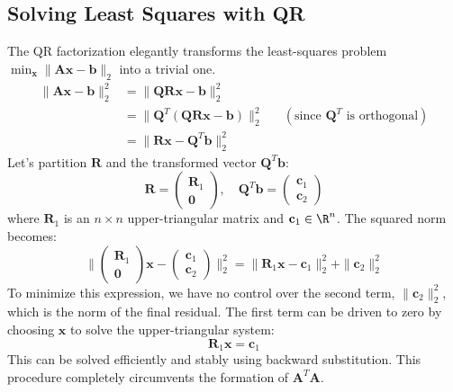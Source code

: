 \begin{proposition}
\subsection{Solving Least Squares with QR}
The QR factorization elegantly transforms the least-squares problem $\min_{\mathbf{x}} \|\mathbf{A}\mathbf{x} - \mathbf{b}\|_2$ into a trivial one.
\begin{align*}
    \|\mathbf{A}\mathbf{x} - \mathbf{b}\|_2^2 &= \|\mathbf{Q}\mathbf{R}\mathbf{x} - \mathbf{b}\|_2^2 \\
    &= \|\mathbf{Q}^T(\mathbf{Q}\mathbf{R}\mathbf{x} - \mathbf{b})\|_2^2 && (\text{since } \mathbf{Q}^T \text{ is orthogonal}) \\
    &= \|\mathbf{R}\mathbf{x} - \mathbf{Q}^T\mathbf{b}\|_2^2
\end{align*}
Let's partition $\mathbf{R}$ and the transformed vector $\mathbf{Q}^T\mathbf{b}$:
\[ \mathbf{R} = \begin{pmatrix} \mathbf{R}_1 \\ \mathbf{0} \end{pmatrix}, \quad \mathbf{Q}^T\mathbf{b} = \begin{pmatrix} \mathbf{c}_1 \\ \mathbf{c}_2 \end{pmatrix} \]
where $\mathbf{R}_1$ is an $n \times n$ upper-triangular matrix and $\mathbf{c}_1 \in \R^n$. The squared norm becomes:
\[ \|\begin{pmatrix} \mathbf{R}_1 \\ \mathbf{0} \end{pmatrix} \mathbf{x} - \begin{pmatrix} \mathbf{c}_1 \\ \mathbf{c}_2 \end{pmatrix}\|_2^2 = \|\mathbf{R}_1\mathbf{x} - \mathbf{c}_1\|_2^2 + \|\mathbf{c}_2\|_2^2 \]
To minimize this expression, we have no control over the second term, $\|\mathbf{c}_2\|_2^2$, which is the norm of the final residual. The first term can be driven to zero by choosing $\mathbf{x}$ to solve the upper-triangular system:
\[ \mathbf{R}_1\mathbf{x} = \mathbf{c}_1 \]
This can be solved efficiently and stably using backward substitution. This procedure completely circumvents the formation of $\mathbf{A}^T\mathbf{A}$.


\end{proposition}
